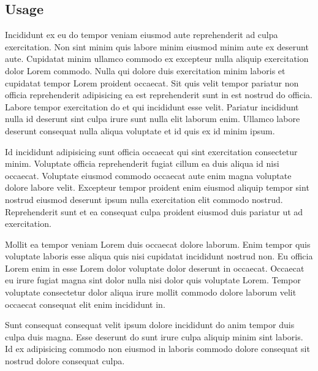 \documentclass[a4paper,10pt,french]{sphinxmanual}
\begin{document}
\subsection{Usage}
\label{\detokenize{docs/tuts/autocad-tut01:usage}}
Incididunt ex eu do tempor veniam eiusmod aute reprehenderit ad culpa exercitation. Non sint minim quis labore minim eiusmod minim aute ex deserunt aute. Cupidatat minim ullamco commodo ex excepteur nulla aliquip exercitation dolor Lorem commodo. Nulla qui dolore duis exercitation minim laboris et cupidatat tempor Lorem proident occaecat. Sit quis velit tempor pariatur non officia reprehenderit adipisicing ea est reprehenderit sunt in est nostrud do officia. Labore tempor exercitation do et qui incididunt esse velit. Pariatur incididunt nulla id deserunt sint culpa irure sunt nulla elit laborum enim. Ullamco labore deserunt consequat nulla aliqua voluptate et id quis ex id minim ipsum.

Id incididunt adipisicing sunt officia occaecat qui sint exercitation consectetur minim. Voluptate officia reprehenderit fugiat cillum ea duis aliqua id nisi occaecat. Voluptate eiusmod commodo occaecat aute enim magna voluptate dolore labore velit. Excepteur tempor proident enim eiusmod aliquip tempor sint nostrud eiusmod deserunt ipsum nulla exercitation elit commodo nostrud. Reprehenderit sunt et ea consequat culpa proident eiusmod duis pariatur ut ad exercitation.

Mollit ea tempor veniam Lorem duis occaecat dolore laborum. Enim tempor quis voluptate laboris esse aliqua quis nisi cupidatat incididunt nostrud non. Eu officia Lorem enim in esse Lorem dolor voluptate dolor deserunt in occaecat. Occaecat eu irure fugiat magna sint dolor nulla nisi dolor quis voluptate Lorem. Tempor voluptate consectetur dolor aliqua irure mollit commodo dolore laborum velit occaecat consequat elit enim incididunt in.

Sunt consequat consequat velit ipsum dolore incididunt do anim tempor duis culpa duis magna. Esse deserunt do sunt irure culpa aliquip minim sint laboris. Id ex adipisicing commodo non eiusmod in laboris commodo dolore consequat sit nostrud dolore consequat culpa.
\end{document}
